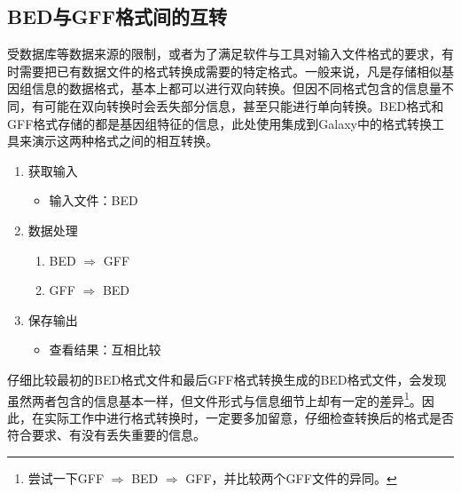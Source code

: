 \documentclass[11pt,a4paper,twoside]{book}
\begin{document}
\subsection{BED与GFF格式间的互转}
受数据库等数据来源的限制，或者为了满足软件与工具对输入文件格式的要求，有时需要把已有数据文件的格式转换成需要的特定格式。一般来说，凡是存储相似基因组信息的数据格式，基本上都可以进行双向转换。但因不同格式包含的信息量不同，有可能在双向转换时会丢失部分信息，甚至只能进行单向转换。BED格式和GFF格式存储的都是基因组特征的信息，此处使用集成到Galaxy中的格式转换工具来演示这两种格式之间的相互转换。
\begin{enumerate}
    \item 获取输入
      \begin{itemize}
        \item 输入文件：BED
      \end{itemize}
    \item 数据处理
      \begin{enumerate}
        \item BED $\Rightarrow$ GFF
        \item GFF $\Rightarrow$ BED
      \end{enumerate}
    \item 保存输出
      \begin{itemize}
        \item 查看结果：互相比较
      \end{itemize}
\end{enumerate}

仔细比较最初的BED格式文件和最后GFF格式转换生成的BED格式文件，会发现虽然两者包含的信息基本一样，但文件形式与信息细节上却有一定的差异\footnote{尝试一下GFF $\Rightarrow$ BED $\Rightarrow$ GFF，并比较两个GFF文件的异同。}。因此，在实际工作中进行格式转换时，一定要多加留意，仔细检查转换后的格式是否符合要求、有没有丢失重要的信息。
\end{document}
